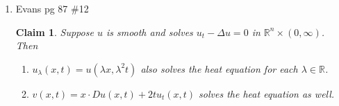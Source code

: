 \documentclass[a4paper]{article}
\newtheorem*{claim}{Claim}
\newcommand{\R}{\mathbb{R}}
\newcommand{\Z}{\mathbb{Z}}
\begin{document}
\begin{enumerate}
\begin{proof}
      Take any $n \in \Z$. Then by \eqref{eq:heat_rec},
      \begin{align*}
        v(nh, (m+1)k) &= \frac{1}{2} v( (n+1)h, mk) + \frac{1}{2} v( (n-1)h, mk) \\
        &= 2^{-(m+1)} \sum_{j=0}^m \binom{m}{j} f( (n+1-m+2j)h) \\
        &\quad + 2^{-(m+1)} \sum_{j=0}^m \binom{m}{j} f( (n-1-m+2j)h) \\
        &= 2^{-(m+1)} \sum_{j=1}^{m+1} \binom{m}{j-1} f( (n-(m+1)+2j)h) \\
        &\quad + 2^{-(m+1)} \sum_{j=0}^m \binom{m}{j} f( (n-(m+1)+2j)h) \\
        &= 2^{-(m+1)} \left( \binom{m}{m} f( (n + (m+1) )h) + \binom{m}{0} f( (n - (m+1))h) \right) \\
        &\quad + \sum_{j=1}^m \left( \binom{m}{j-1} \binom{m}{j} \right) f( (n-(m+1)+2j)h) \\
        &= 2^{-(m+1)} \sum_{j=0}^{m+1} \binom{m+1}{j} f( (n-(m+1)+2j)h)
      \end{align*}

      Therefore, we have
      \[ v(nh, mk) = 2^{-m} \sum_{j=0}^m \binom{m}{j} f \left( (n - m + 2j)h \right) .\]
      for all $m,n \in \Z$ with $m>0$.

      Also, we have for any $m\geq 0$
      \begin{align*}
        \sup_{n \in \Z} |v(nh,mk)| &\leq \sup_\R |f| 2^{-m} \sum_{j=0}^m \binom{m}{j} \\
        &= \sup_\R |f| 2^{-m} 2^m \\
        &= \sup_\R |f|
      \end{align*}

      Then taking the supremum over all $m \geq 0$, we get
      \[ \sup_{\Sigma} |v| \leq \sup_{\R} |f| .\]

    \end{proof}

  \item Evans pg 87 \#12
    \begin{claim}
      Suppose $u$ is smooth and solves $u_t - \Delta u = 0$ in $\R^n \times (0,\infty)$. Then
      \begin{enumerate}
        \item $u_\lambda(x,t) = u(\lambda x, \lambda^2 t)$ also solves the heat equation for each $\lambda \in \R$.

        \item $v(x,t) = x \cdot Du(x,t) + 2t u_t(x,t)$ solves the heat equation as well.
      \end{enumerate}


\end{claim}
\end{enumerate}
\end{document}
